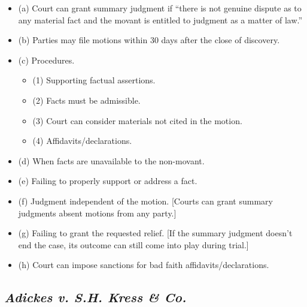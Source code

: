 \begin{itemize}
    \item (a) Court can grant summary judgment if ``there is not genuine dispute as to any material fact and the movant is entitled to judgment as a matter of law.''
    \item (b) Parties may file motions within 30 days after the close of discovery.
    \item (c) Procedures.
    \begin{itemize}
        \item (1) Supporting factual assertions.
        \item (2) Facts must be admissible.
        \item (3) Court can consider materials not cited in the motion.
        \item (4) Affidavits/declarations.
    \end{itemize}
    \item (d) When facts are unavailable to the non-movant.
    \item (e) Failing to properly support or address a fact.
    \item (f) Judgment independent of the motion. [Courts can grant summary judgments absent motions from any party.]
    \item (g) Failing to grant the requested relief. [If the summary judgment doesn't end the case, its outcome can still come into play during trial.]
    \item (h) Court can impose sanctions for bad faith affidavits/declarations.
\end{itemize}

\subsection{\emph{Adickes v. S.H. Kress \& Co.}}

